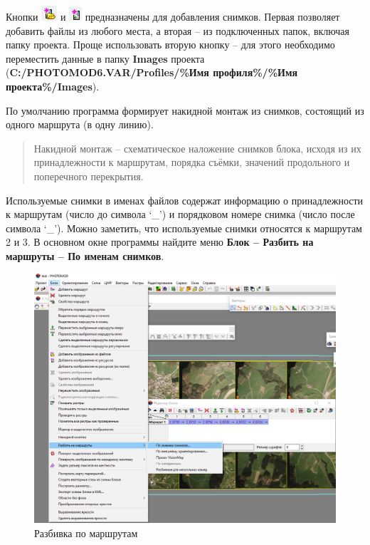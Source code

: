 \documentclass[
  12pt,
]{book}
\begin{document}
Кнопки \includegraphics{images/Ref15/Add_Image1.png} и \includegraphics{images/Ref15/Add_Image2.png} предназначены для добавления снимков. Первая позволяет добавить файлы из любого места, а вторая -- из подключенных папок, включая папку проекта. Проще использовать вторую кнопку -- для этого необходимо переместить данные в папку \textbf{Images} проекта (\textbf{C:/PHOTOMOD6.VAR/Profiles/\%Имя профиля\%/\%Имя проекта\%/Images}).

По умолчанию программа формирует накидной монтаж из снимков, состоящий из одного маршрута (в одну линию).

\begin{quote}
Накидной монтаж -- схематическое наложение снимков блока, исходя из их принадлежности к маршрутам, порядка съёмки, значений продольного и поперечного перекрытия.
\end{quote}

Используемые снимки в именах файлов содержат информацию о принадлежности к маршрутам (число до символа `\_') и порядковом номере снимка (число после символа `\_'). Можно заметить, что используемые снимки относятся к маршрутам 2 и 3. В основном окне программы найдите меню \textbf{Блок -- Разбить на маршруты -- По именам снимков}.

\begin{figure}
\centering
\includegraphics{images/Ref15/Split_Block.png}
\caption{Разбивка по маршрутам}
\end{figure}
\end{document}
